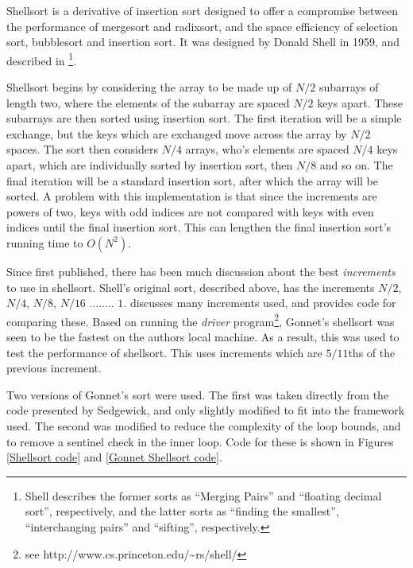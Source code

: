 \label{shell}

Shellsort is a derivative of insertion sort designed to offer a compromise
between the performance of mergesort and radixsort, and the space efficiency of
selection sort, bubblesort and insertion sort. It was designed by Donald Shell
in 1959, and described in \cite{Shell59}\footnote{Shell describes the former
sorts as ``Merging Pairs'' and ``floating decimal sort'', respectively, and the
latter sorts as ``finding the smallest'', ``interchanging pairs'' and ``sifting'',
respectively.}.

Shellsort begins by considering the array to be made up of $N/2$ subarrays of
length two, where the elements of the subarray are spaced $N/2$ keys apart.
These subarrays are then sorted using insertion sort. The first iteration will
be a simple exchange, but the keys which are exchanged move across the array by
$N/2$ spaces. The sort then considers $N/4$ arrays, who's elements are spaced
$N/4$ keys apart, which are individually sorted by insertion sort, then $N/8$
and so on. The final iteration will be a standard insertion sort, after which
the array will be sorted. A problem with this implementation is that since the
increments are powers of two, keys with odd indices are not compared with keys
with even indices until the final insertion sort. This can lengthen the final
insertion sort's running time to $O(N^2)$.

Since first published, there has been much discussion about the best
\textit{increments} to use in shellsort. Shell's original sort, described above,
has the increments $N/2$, $N/4$, $N/8$, $N/16$ ........ $1$. \cite{Sedgewick96}
discusses many increments used, and provides code for comparing these. Based
on running the \textit{driver} program\footnote{see
http://www.cs.princeton.edu/\textasciitilde{}rs/shell/}, Gonnet's shellsort was
seen to be the fastest on the authors local machine. As a result, this was used
to test the performance of shellsort. This uses increments which are $5/11$ths
of the previous increment.

Two versions of Gonnet's sort were used. The first was taken directly from the
code presented by Sedgewick, and only slightly modified to fit into the framework used.
The second was modified to reduce the complexity of the loop bounds, and to
remove a sentinel check in the inner loop. Code for these is shown in Figures
\ref{Shellsort code} and \ref{Gonnet Shellsort code}.

